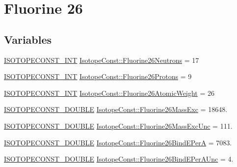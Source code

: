 \hypertarget{group___isotope_const-_fluorine-_f26}{}\section{Fluorine 26}
\label{group___isotope_const-_fluorine-_f26}
\subsection*{Variables}
\begin{DoxyCompactItemize}
\item 
\mbox{\hyperlink{group___isotope_const-_macros_ga5f18360b3e99483a35c32d789e62621c}{I\+S\+O\+T\+O\+P\+E\+C\+O\+N\+S\+T\+\_\+\+I\+NT}} \mbox{\hyperlink{group___isotope_const-_fluorine-_f26_gad5ed672e82bd4792a63c3fb1540c7d5b}{Isotope\+Const\+::\+Fluorine26\+Neutrons}} = 17
\item 
\mbox{\hyperlink{group___isotope_const-_macros_ga5f18360b3e99483a35c32d789e62621c}{I\+S\+O\+T\+O\+P\+E\+C\+O\+N\+S\+T\+\_\+\+I\+NT}} \mbox{\hyperlink{group___isotope_const-_fluorine-_f26_ga1a5dd2da18d0cbbc7d6fb87618d011fc}{Isotope\+Const\+::\+Fluorine26\+Protons}} = 9
\item 
\mbox{\hyperlink{group___isotope_const-_macros_ga5f18360b3e99483a35c32d789e62621c}{I\+S\+O\+T\+O\+P\+E\+C\+O\+N\+S\+T\+\_\+\+I\+NT}} \mbox{\hyperlink{group___isotope_const-_fluorine-_f26_ga0c00b84f7b1bac82e59a4fb493996b44}{Isotope\+Const\+::\+Fluorine26\+Atomic\+Weight}} = 26
\item 
\mbox{\hyperlink{group___isotope_const-_macros_ga8f45a7272ce02c0b4c65c44636ed719a}{I\+S\+O\+T\+O\+P\+E\+C\+O\+N\+S\+T\+\_\+\+D\+O\+U\+B\+LE}} \mbox{\hyperlink{group___isotope_const-_fluorine-_f26_ga768dfba9c7d2e3daa8d1029837392cff}{Isotope\+Const\+::\+Fluorine26\+Mass\+Exc}} = 18648.
\item 
\mbox{\hyperlink{group___isotope_const-_macros_ga8f45a7272ce02c0b4c65c44636ed719a}{I\+S\+O\+T\+O\+P\+E\+C\+O\+N\+S\+T\+\_\+\+D\+O\+U\+B\+LE}} \mbox{\hyperlink{group___isotope_const-_fluorine-_f26_ga0ce90e1a718d0aeea27b7c996095fc82}{Isotope\+Const\+::\+Fluorine26\+Mass\+Exc\+Unc}} = 111.
\item 
\mbox{\hyperlink{group___isotope_const-_macros_ga8f45a7272ce02c0b4c65c44636ed719a}{I\+S\+O\+T\+O\+P\+E\+C\+O\+N\+S\+T\+\_\+\+D\+O\+U\+B\+LE}} \mbox{\hyperlink{group___isotope_const-_fluorine-_f26_ga09d5dcb93a5ba236431593d01a10a48d}{Isotope\+Const\+::\+Fluorine26\+Bind\+E\+PerA}} = 7083.
\item 
\mbox{\hyperlink{group___isotope_const-_macros_ga8f45a7272ce02c0b4c65c44636ed719a}{I\+S\+O\+T\+O\+P\+E\+C\+O\+N\+S\+T\+\_\+\+D\+O\+U\+B\+LE}} \mbox{\hyperlink{group___isotope_const-_fluorine-_f26_gad15a5a8d45e53af4a9db34ca4c187548}{Isotope\+Const\+::\+Fluorine26\+Bind\+E\+Per\+A\+Unc}} = 4.

\end{DoxyCompactItemize}
